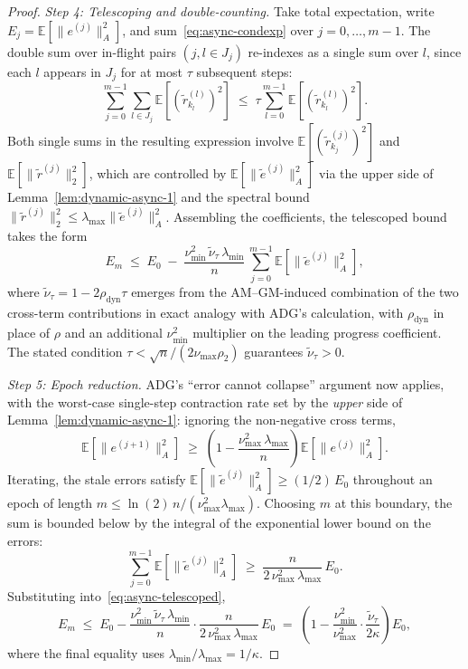 \documentclass[pdflatex,sn-mathphys-num]{sn-jnl}%
\newcommand{\E}{\mathbb{E}}
\newcommand{\Anorm}[1]{\|#1\|_{A}}
\newcommand{\lmin}{\lambda_{\min}}
\newcommand{\lmax}{\lambda_{\max}}
\theoremstyle{thmstyleone}%
\theoremstyle{thmstyletwo}%
\theoremstyle{thmstylethree}%
\begin{document}
\begin{proof}
\smallskip\noindent\textit{Step 4: Telescoping and double-counting.} Take total expectation, write $E_j = \E[\Anorm{e^{(j)}}^2]$, and sum~\eqref{eq:async-condexp} over $j = 0, \ldots, m-1$. The double sum over in-flight pairs $(j, l \in J_j)$ re-indexes as a single sum over $l$, since each $l$ appears in $J_j$ for at most $\tau$ subsequent steps:
\[
\sum_{j=0}^{m-1} \sum_{l \in J_j} \E[(\tilde r_{k_l}^{(l)})^2] \;\leq\; \tau \sum_{l=0}^{m-1} \E[(\tilde r_{k_l}^{(l)})^2].
\]
Both single sums in the resulting expression involve $\E[(\tilde r_{k_j}^{(j)})^2]$ and $\E[\|\tilde r^{(j)}\|_2^2]$, which are controlled by $\E[\Anorm{\tilde e^{(j)}}^2]$ via the upper side of Lemma~\ref{lem:dynamic-async-1} and the spectral bound $\|\tilde r^{(j)}\|_2^2 \leq \lmax \Anorm{\tilde e^{(j)}}^2$. Assembling the coefficients, the telescoped bound takes the form
\begin{equation}
\label{eq:async-telescoped}
E_m \;\leq\; E_0 \;-\; \frac{\nu_{\min}^2\,\tilde\nu_\tau\,\lmin}{n}\,\sum_{j=0}^{m-1} \E[\Anorm{\tilde e^{(j)}}^2],
\end{equation}
where $\tilde\nu_\tau = 1 - 2\rho_{\text{dyn}}\tau$ emerges from the AM--GM-induced combination of the two cross-term contributions in exact analogy with ADG's calculation, with $\rho_{\text{dyn}}$ in place of $\rho$ and an additional $\nu_{\min}^2$ multiplier on the leading progress coefficient. The stated condition $\tau < \sqrt n/(2\nu_{\max}\rho_2)$ guarantees $\tilde\nu_\tau > 0$.

\smallskip\noindent\textit{Step 5: Epoch reduction.} ADG's ``error cannot collapse'' argument now applies, with the worst-case single-step contraction rate set by the \emph{upper} side of Lemma~\ref{lem:dynamic-async-1}: ignoring the non-negative cross terms,
\[
    \E[\Anorm{e^{(j+1)}}^2] \;\geq\; \left(1 - \frac{\nu_{\max}^2\,\lmax}{n}\right) \E[\Anorm{e^{(j)}}^2].
\]
Iterating, the stale errors satisfy $\E[\Anorm{\tilde e^{(j)}}^2] \geq (1/2)\,E_0$ throughout an epoch of length $m \leq \ln(2)\,n/(\nu_{\max}^2\lmax)$. Choosing $m$ at this boundary, the sum is bounded below by the integral of the exponential lower bound on the errors:
\[
    \sum_{j=0}^{m-1}\E[\Anorm{\tilde e^{(j)}}^2] \;\geq\; \frac{n}{2\,\nu_{\max}^2\,\lmax}\,E_0.
\]
Substituting into~\eqref{eq:async-telescoped},
\[
    E_m \;\leq\; E_0 - \frac{\nu_{\min}^2\,\tilde\nu_\tau\,\lmin}{n} \cdot \frac{n}{2\,\nu_{\max}^2\,\lmax}\,E_0
    \;=\; \left(1 - \frac{\nu_{\min}^2}{\nu_{\max}^2}\cdot\frac{\tilde\nu_\tau}{2\kappa}\right) E_0,
\]
where the final equality uses $\lmin/\lmax = 1/\kappa$.
\end{proof}
\end{document}
